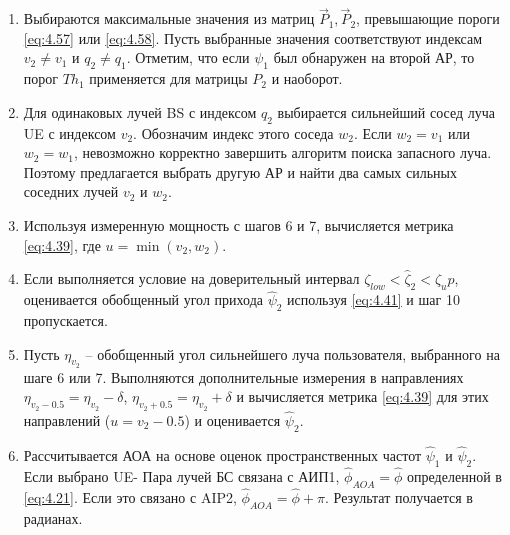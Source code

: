 \begin{enumerate}[label=\textbf{Шаг \arabic*:}]
    \item Выбираются максимальные значения из матриц $\vec P_1, \vec P_2$,
          превышающие пороги \eqref{eq:4.57} или \eqref{eq:4.58}. Пусть выбранные значения соответствуют
          индексам $v_2\neq v_1$ и $q_2 \neq q_1$.  Отметим, что если $\psi_1$ был
          обнаружен на второй АР, то порог $Th_1$ применяется для матрицы $P_2$ и наоборот.
    \item Для одинаковых лучей BS с индексом $q_2$ выбирается сильнейший сосед луча UE
          с индексом $v_2$. Обозначим индекс этого соседа $w_2$. Если $w_2 = v_1$ или $w_2=w_1$,
          невозможно корректно завершить алгоритм поиска запасного луча. Поэтому предлагается
          выбрать другую АР и найти два самых сильных соседних лучей $v_2$ и $w_2$.
    \item Используя измеренную мощность с шагов 6 и 7, вычисляется метрика \eqref{eq:4.39},
          где $u=\min(v_2,w_2)$.
    \item Если выполняется условие на доверительный интервал $\zeta_{low} < \hat \zeta_2 < \zeta_up$,
          оценивается обобщенный угол прихода $\hat \psi_2$ используя \eqref{eq:4.41} и шаг 10 пропускается.
    \item Пусть $\eta_{v_2}$ -- обобщенный угол сильнейшего луча пользователя, выбранного на шаге 6 или 7.
          Выполняются дополнительные измерения в направлениях
          $\eta_{v_2 - 0.5} = \eta_{v_2} - \delta$,
          $\eta_{v_2 + 0.5} = \eta_{v_2} + \delta$ и вычисляется метрика \eqref{eq:4.39}
          для этих направлений ($u=v_2 - 0.5$) и оценивается $\hat \psi_2$.
    \item Рассчитывается АОА на основе оценок пространственных частот $\hat \psi_1$ и
          $\hat \psi_2$. Если выбрано UE- Пара лучей БС связана с АИП1, $\hat \phi_{AOA}=\hat \phi$
          определенной в \eqref{eq:4.21}.
          Если это связано с AIP2, $\hat \phi_{AOA} = \hat\phi + \pi$. Результат
          получается в радианах.
\end{enumerate}

